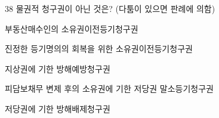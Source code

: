 \begin{question}{38}
물권적 청구권이 아닌 것은? (다툼이 있으면 판례에 의함)
\begin{choices}
  \item 부동산매수인의 소유권이전등기청구권
  \item 진정한 등기명의의 회복을 위한 소유권이전등기청구권
  \item 지상권에 기한 방해예방청구권
  \item 피담보채무 변제 후의 소유권에 기한 저당권 말소등기청구권
  \item 저당권에 기한 방해배제청구권
\end{choices}
\end{question}
